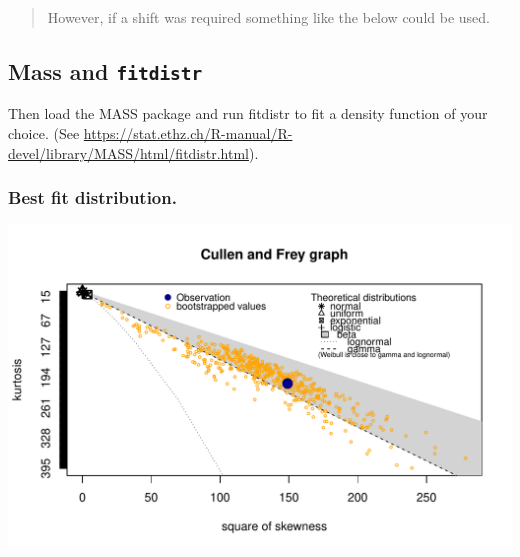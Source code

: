 \documentclass[]{article}
\newenvironment{Shaded}{\begin{snugshade}}{\end{snugshade}}
\newcommand{\KeywordTok}[1]{\textcolor[rgb]{0.13,0.29,0.53}{\textbf{{#1}}}}
\newcommand{\DataTypeTok}[1]{\textcolor[rgb]{0.13,0.29,0.53}{{#1}}}
\newcommand{\DecValTok}[1]{\textcolor[rgb]{0.00,0.00,0.81}{{#1}}}
\newcommand{\StringTok}[1]{\textcolor[rgb]{0.31,0.60,0.02}{{#1}}}
\newcommand{\OtherTok}[1]{\textcolor[rgb]{0.56,0.35,0.01}{{#1}}}
\newcommand{\NormalTok}[1]{{#1}}
\begin{document}
\begin{quote}
However, if a shift was required something like the below could be used.
\end{quote}

\begin{Shaded}
\end{Shaded}

\newpage

\subsection{\texorpdfstring{Mass and
\texttt{fitdistr}}{Mass and fitdistr}}\label{mass-and-fitdistr}

Then load the MASS package and run fitdistr to fit a density function of
your choice. (See
\url{https://stat.ethz.ch/R-manual/R-devel/library/MASS/html/fitdistr.html}).

\subsubsection{Best fit distribution.}\label{best-fit-distribution.}

\begin{Shaded}
\end{Shaded}

\includegraphics{Final_Project_files/figure-latex/unnamed-chunk-14-1.pdf}
\end{document}

